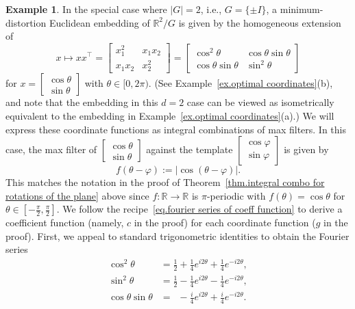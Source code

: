 \documentclass{article}
\theoremstyle{plain}
\theoremstyle{definition}
\newtheorem{example}[theorem]{Example}
\begin{document}
\begin{example}
In the special case where $|G|=2$, i.e., $G=\{\pm I\}$, a minimum-distortion Euclidean embedding of $\mathbb{R}^2/G$ is given by the homogeneous extension of
\[
x
\mapsto xx^\top
=
\left[\begin{array}{cc}
x_1^2 & x_1x_2 \\
x_1x_2 & x_2^2
\end{array}\right]
=\left[\begin{array}{cc}
\cos^2\theta & \cos\theta\sin\theta \\
\cos\theta\sin\theta & \sin^2\theta
\end{array}\right]
\]
for $x=\left[\begin{smallmatrix}\cos\theta\\\sin\theta\end{smallmatrix}\right]$ with $\theta\in[0,2\pi)$.
(See Example~\ref{ex.optimal coordinates}(b), and note that the embedding in this $d=2$ case can be viewed as isometrically equivalent to the embedding in Example~\ref{ex.optimal coordinates}(a).)
We will express these coordinate functions as integral combinations of max filters.
In this case, the max filter of $\left[\begin{smallmatrix}\cos\theta\\\sin\theta\end{smallmatrix}\right]$ against the template $\left[\begin{smallmatrix}\cos\varphi\\\sin\varphi\end{smallmatrix}\right]$ is given by
\[
f(\theta-\varphi)
:=|\cos(\theta-\varphi)|.
\]
This matches the notation in the proof of Theorem~\ref{thm.integral combo for rotations of the plane} above since $f\colon\mathbb{R}\to\mathbb{R}$ is $\pi$-periodic with $f(\theta)=\cos\theta$ for $\theta\in[-\frac{\pi}{2},\frac{\pi}{2}]$.
We follow the recipe~\eqref{eq.fourier series of coeff function} to derive a coefficient function (namely, $c$ in the proof) for each coordinate function ($g$ in the proof).
First, we appeal to standard trigonometric identities to obtain the Fourier series
\begin{align*}
\cos^2\theta
&=\tfrac{1}{2}+\tfrac{1}{4}e^{i2\theta}+\tfrac{1}{4}e^{-i2\theta}, \\
\sin^2\theta
&=\tfrac{1}{2}-\tfrac{1}{4}e^{i2\theta}-\tfrac{1}{4}e^{-i2\theta}, \\
\cos\theta\sin\theta
&=\phantom{\tfrac{1}{2}}-\tfrac{i}{4}e^{i2\theta}+\tfrac{i}{4}e^{-i2\theta}.
\end{align*}

\end{example}
\end{document}
